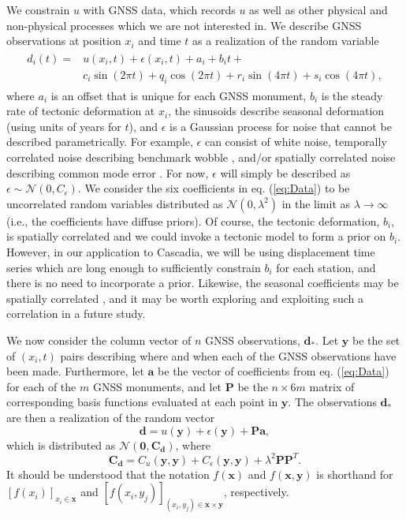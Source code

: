 \documentclass[10pt,a4paper]{article}
\begin{document}
We constrain $u$ with GNSS data, which records $u$ as well as other physical and non-physical processes which we are not interested in. We describe GNSS observations at position $x_i$ and time $t$ as a realization of the random variable 
\begin{align}\label{eq:Data}
\begin{split}
d_{i}(t) = &u(x_i,t) + \epsilon(x_i,t) + a_{i} + b_{i}t + \\
         &c_{i}\sin(2 \pi t) + q_{i}\cos(2 \pi t) + r_{i}\sin(4 \pi t) + s_{i}\cos(4 \pi t), 
\end{split}
\end{align}
where $a_{i}$ is an offset that is unique for each GNSS monument, $b_{i}$ is the steady rate of tectonic deformation at $x_i$, the sinusoids describe seasonal deformation (using units of years for $t$), and $\epsilon$ is a Gaussian process for noise that cannot be described parametrically. For example, $\epsilon$ can consist of white noise, temporally correlated noise describing benchmark wobble \citep[e.g.,][]{Wyatt1982,Wyatt1989}, and/or spatially correlated noise describing common mode error \citep[e.g.,][]{Wdowinski1997}. For now, $\epsilon$ will simply be described as $\epsilon \sim \mathcal{N}(0,C_\epsilon)$. We consider the six coefficients in eq. (\ref{eq:Data}) to be uncorrelated random variables distributed as $\mathcal{N}(0,\lambda^2)$ in the limit as $\lambda \to \infty$ (i.e., the coefficients have diffuse priors). Of course, the tectonic deformation, $b_{i}$, is spatially correlated and we could invoke a tectonic model to form a prior on $b_{i}$. However, in our application to Cascadia, we will be using displacement time series which are long enough to sufficiently constrain $b_{i}$ for each station, and there is no need to incorporate a prior. Likewise, the seasonal coefficients may be spatially correlated \citep{Langbein2008}, and it may be worth exploring and exploiting such a correlation in a future study. 

We now consider the column vector of $n$ GNSS observations, $\bm{d}_*$. Let $\bm{y}$ be the set of $(x_i, t)$ pairs describing where and when each of the GNSS observations have been made. Furthermore, let $\bm{a}$ be the vector of coefficients from eq. (\ref{eq:Data}) for each of the $m$ GNSS monuments, and let $\bm{P}$ be the $n \times 6m$ matrix of corresponding basis functions evaluated at each point in $\bm{y}$. The observations $\bm{d}_*$ are then a realization of the random vector
\begin{equation}
\bm{d} = u(\bm{y}) + \epsilon(\bm{y}) + \bm{P}\bm{a},
\end{equation}
which is distributed as $\mathcal{N}(\bm{0},\bm{C_d})$, where
\begin{equation}\label{eq:Cd}
\bm{C_d} = C_u(\bm{y},\bm{y}) + C_\epsilon(\bm{y},\bm{y}) + 
           \lambda^2\bm{P}\bm{P}^T.
\end{equation}
It should be understood that the notation $f(\bm{x})$ and $f(\bm{x},\bm{y})$ is shorthand for $[f(x_i)]_{x_i \in \bm{x}}$ and $[f(x_i,y_j)]_{(x_i,y_j) \in \bm{x} \times \bm{y}}$, respectively. 
\end{document}
